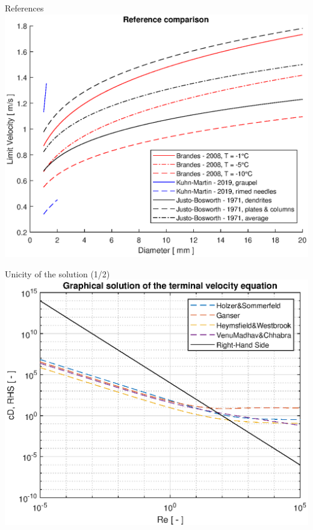 \documentclass[11pt]{beamer}
\begin{document}
	\begin{frame}{References}
		\centering
		\includegraphics[height=\textheight,width=\textwidth,keepaspectratio] {references_vt_all.eps}		
	\end{frame}

	\begin{frame}{Unicity of the solution (1/2)}
		\centering
		\includegraphics[height=\textheight,width=\textwidth,keepaspectratio] {unicity_min.eps}		
	\end{frame}
\end{document}
